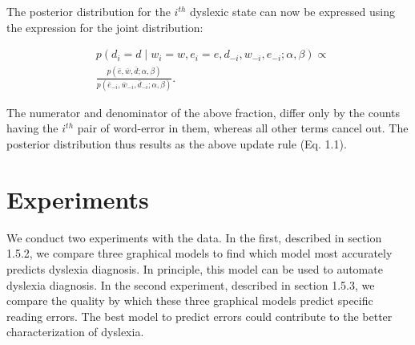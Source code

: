 The posterior distribution for the $i^{th}$ dyslexic state can now be expressed using the expression for the joint distribution:

\begin{equation*}
\begin{split}
&p(d_i=d\mid w_i=w, e_i=e, d_{-i}, w_{-i}, e_{-i}; \alpha, \beta) \propto \\
&\frac{p(\bar{e},\bar{w},\bar{d};\alpha,\beta)}{p(\bar{e}_{-i},\bar{w}_{-i},\bar{d}_{-i};\alpha,\beta)}.
\end{split}
\end{equation*}

The numerator and denominator of the above fraction, differ only by the counts having the $i^{th}$ pair of word-error in them, whereas all other terms cancel out. The posterior distribution thus results as the above update rule (Eq. 1.1).

\section{Experiments}
We conduct two experiments with the data. In the first, described in section 1.5.2, we compare three graphical models to find which model most accurately predicts dyslexia diagnosis. In principle, this model can be used to automate dyslexia diagnosis. In the second experiment, described in section 1.5.3, we compare the quality by which these three graphical models predict specific reading errors. The best model to predict errors could contribute to the better characterization of dyslexia.

